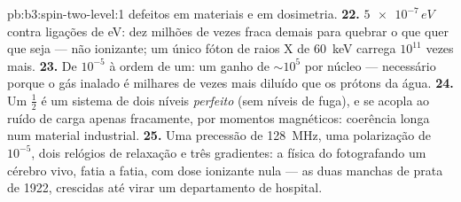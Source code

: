 \begin{solution}{pb:b3:spin-two-level:1}
defeitos em materiais e em dosimetria.
\textbf{22.} $\num{5e-7}\,\unit{eV}$ contra ligações de eV: dez milhões
de vezes fraca demais para quebrar o que quer que seja --- não
ionizante; um único fóton de raios X de \qty{60}{keV} carrega
$10^{11}$ vezes mais.
\textbf{23.} De $10^{-5}$ à ordem de um: um ganho de $\sim10^5$ por
núcleo --- necessário porque o gás inalado é milhares de vezes mais
diluído que os prótons da água.
\textbf{24.} Um  $\tfrac12$ é um sistema de dois níveis
\emph{perfeito} (sem níveis de fuga), e se acopla ao ruído de carga
apenas fracamente, por momentos magnéticos: coerência longa num
material industrial.
\textbf{25.} Uma precessão de \qty{128}{MHz}, uma polarização de
$10^{-5}$, dois relógios de relaxação e três gradientes: a física do
 fotografando um cérebro vivo, fatia a fatia, com dose ionizante
nula --- as duas manchas de prata de 1922, crescidas até virar um
departamento de hospital.
\end{solution}
